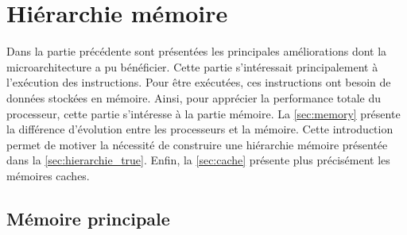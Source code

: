 \section{Hiérarchie mémoire} \label{sec:hierarchie}




  

Dans la partie précédente sont présentées les principales améliorations dont la microarchitecture a pu  bénéficier. Cette partie s'intéressait principalement à l'exécution des instructions. Pour être exécutées, ces instructions ont besoin de données stockées en mémoire. Ainsi, pour apprécier la performance totale du processeur, cette partie s'intéresse à la partie mémoire. 
La \autoref{sec:memory} présente la différence d'évolution entre les processeurs et la mémoire. Cette introduction permet de motiver la nécessité de construire une hiérarchie mémoire présentée dans la \autoref{sec:hierarchie_true}. Enfin, la \autoref{sec:cache} présente plus précisément les mémoires caches.


\subsection{Mémoire principale} \label{sec:memory}

